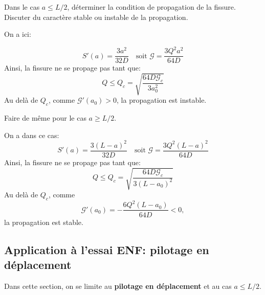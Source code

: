 \begin{questions}
\setcounter{question}{3}
\question Dans le cas $a\leq L/2$, déterminer la condition de propagation de la fissure. Discuter du caractère stable ou instable de la propagation.
\begin{solution}
On a ici:

$$S'(a) = \dfrac{3a^2}{32 D} \quad \text{soit } \mathcal{G}=\dfrac{3Q^2a^2}{64D}$$
Ainsi, la fissure ne se propage pas tant que:
$$Q \leq Q_c = \sqrt{\dfrac{64D\mathcal{G}_c}{3a_0^2}}$$
Au delà de $Q_c$, comme $\mathcal{G}'(a_0) >0$, la propagation est instable.
\end{solution}
\question Faire de même pour le cas $a \geq L/2$.
\begin{solution}
On a dans ce cas:
$$S'(a) = \dfrac{3(L-a)^2}{32D} \quad \text{soit } \mathcal{G}=\dfrac{3Q^2(L-a)^2}{64D}$$
Ainsi, la fissure ne se propage pas tant que:
$$Q \leq Q_c = \sqrt{\dfrac{64D\mathcal{G}_c}{3(L-a_0)^2}}$$
Au delà de $Q_c$, comme 
$$\mathcal{G}'(a_0) =  -\dfrac{6Q^2(L-a_0)}{64D}<0,$$ la propagation est stable.
\end{solution}
\end{questions}

\subsection{Application à l'essai ENF: pilotage en déplacement}

Dans cette section, on se limite au \textbf{pilotage en déplacement} et au cas $a\leq L/2$.

